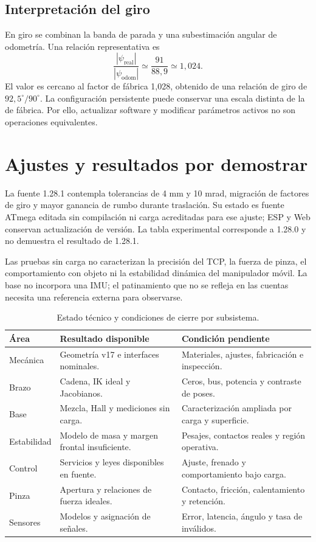 \subsection{Interpretación del giro}
En giro se combinan la banda de parada y una subestimación angular de odometría. Una relación representativa es
\begin{equation}
\frac{|\psi_{\mathrm{real}}|}{|\psi_{\mathrm{odom}}|}
\simeq\frac{91}{88{,}9}\simeq1{,}024.
\end{equation}
El valor es cercano al factor de fábrica 1,028, obtenido de una relación de giro de $92{,}5^{\circ}/90^{\circ}$. La configuración persistente puede conservar una escala distinta de la de fábrica. Por ello, actualizar software y modificar parámetros activos no son operaciones equivalentes.

\section{Ajustes y resultados por demostrar}
La fuente 1.28.1 contempla tolerancias de 4 mm y 10 mrad, migración de factores de giro y mayor ganancia de rumbo durante traslación. Su estado es fuente ATmega editada sin compilación ni carga acreditadas para ese ajuste; ESP y Web conservan actualización de versión. La tabla experimental corresponde a 1.28.0 y no demuestra el resultado de 1.28.1.

Las pruebas sin carga no caracterizan la precisión del TCP, la fuerza de pinza, el comportamiento con objeto ni la estabilidad dinámica del manipulador móvil. La base no incorpora una IMU; el patinamiento que no se refleja en las cuentas necesita una referencia externa para observarse.

\begin{table}[!htbp]\centering\small
\caption{Estado técnico y condiciones de cierre por subsistema.}
\begin{tabularx}{\linewidth}{@{}P{29mm}YY@{}}
\toprule\textbf{Área} & \textbf{Resultado disponible} & \textbf{Condición pendiente}\\\midrule
Mecánica & Geometría v17 e interfaces nominales. & Materiales, ajustes, fabricación e inspección.\\
Brazo & Cadena, IK ideal y Jacobianos. & Ceros, bus, potencia y contraste de poses.\\
Base & Mezcla, Hall y mediciones sin carga. & Caracterización ampliada por carga y superficie.\\
Estabilidad & Modelo de masa y margen frontal insuficiente. & Pesajes, contactos reales y región operativa.\\
Control & Servicios y leyes disponibles en fuente. & Ajuste, frenado y comportamiento bajo carga.\\
Pinza & Apertura y relaciones de fuerza ideales. & Contacto, fricción, calentamiento y retención.\\
Sensores & Modelos y asignación de señales. & Error, latencia, ángulo y tasa de inválidos.\\\bottomrule
\end{tabularx}
\end{table}

